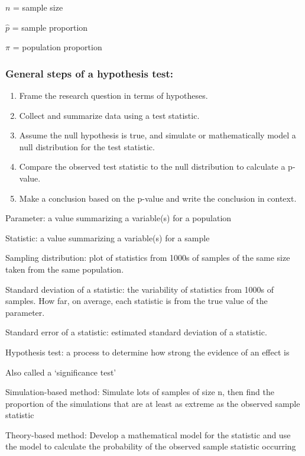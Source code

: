 \documentclass[
]{report}
\newcommand{\rgi}{\hspace{24pt}}  %
\begin{document}
\(n\) = sample size

\(\hat{p}\) = sample proportion

\(\pi\) = population proportion

\hypertarget{general-steps-of-a-hypothesis-test-1}{%
\subsubsection*{General steps of a hypothesis test:}\label{general-steps-of-a-hypothesis-test-1}}

\begin{enumerate}
\def\labelenumi{\arabic{enumi}.}
\item
  Frame the research question in terms of hypotheses.
\item
  Collect and summarize data using a test statistic.
\item
  Assume the null hypothesis is true, and simulate or mathematically model a null distribution for the test statistic.
\item
  Compare the observed test statistic to the null distribution to calculate a p-value.
\item
  Make a conclusion based on the p-value and write the conclusion in context.
\end{enumerate}

Parameter: a value summarizing a variable(s) for a population

Statistic: a value summarizing a variable(s) for a sample

Sampling distribution: plot of statistics from 1000s of samples of the same size taken from the same population.

Standard deviation of a statistic: the variability of statistics from 1000s of samples. How far, on average, each statistic is from the true value of the parameter.

Standard error of a statistic: estimated standard deviation of a statistic.

Hypothesis test: a process to determine how strong the evidence of an effect is

\rgi Also called a `significance test'

Simulation-based method: Simulate lots of samples of size n, then find the proportion of the simulations that are at least as extreme as the observed sample statistic

Theory-based method: Develop a mathematical model for the statistic and use the model to calculate the probability of the observed sample statistic occurring
\end{document}
